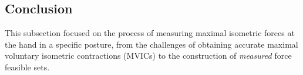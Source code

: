 


\subsection{Conclusion}
This subsection focused on the process of measuring maximal isometric forces at the hand in a specific posture, from the challenges of obtaining accurate maximal voluntary isometric contractions (MVICs) to the construction of \emph{measured} force feasible sets. 

